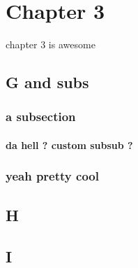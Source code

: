 \chapter{Chapter 3}
\minitoc%

chapter 3 is awesome

\section{G and subs}
\subsection{a subsection}

\subsubsection{da hell ? custom subsub ?}

\subsection{yeah pretty cool}
\section{H}
\section{I}
